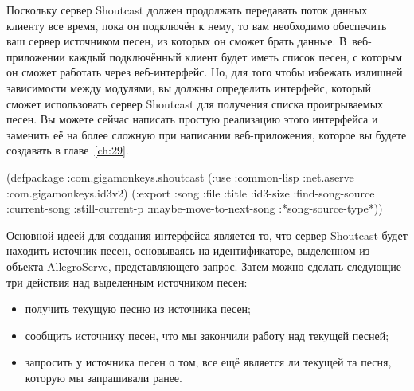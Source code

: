 Поскольку сервер Shoutcast должен продолжать передавать поток данных клиенту все время,
пока он подключён к нему, то вам необходимо обеспечить ваш сервер источником песен, из
которых он сможет брать данные.  В~веб-приложении каждый подключённый клиент будет иметь
список песен, с которым он сможет работать через веб-интерфейс.  Но, для того чтобы
избежать излишней зависимости между модулями, вы должны определить интерфейс, который
сможет использовать сервер Shoutcast для получения списка проигрываемых песен. Вы можете
сейчас написать простую реа\-ли\-за\-цию этого интерфейса и заменить её на более сложную при
написании веб-приложения, которое вы будете создавать в главе~\ref{ch:29}.

\vfill{}
\pagebreak{}

\begin{lrbox}{\chtwoeightone}
  \begin{minipage}{\linewidth}
\begin{myverb}
(defpackage :com.gigamonkeys.shoutcast
  (:use :common-lisp 
        :net.aserve 
        :com.gigamonkeys.id3v2)
  (:export :song
           :file
           :title
           :id3-size
           :find-song-source
           :current-song
           :still-current-p
           :maybe-move-to-next-song
           :*song-source-type*))
\end{myverb}
  \end{minipage}
\end{lrbox}


Основной идеей для создания интерфейса является то, что сервер Shoutcast будет находить
источник песен, основываясь на идентификаторе, выделенном из объекта AllegroServe,
представляющего запрос.  Затем можно сделать следующие три действия над выделенным
источником песен:
\begin{itemize}
\item получить текущую песню из источника песен;
\item сообщить источнику песен, что мы закончили работу над текущей песней;
\item запросить у источника песен о том, все ещё является ли текущей та песня, которую мы
  запрашивали ранее.
\end{itemize}

